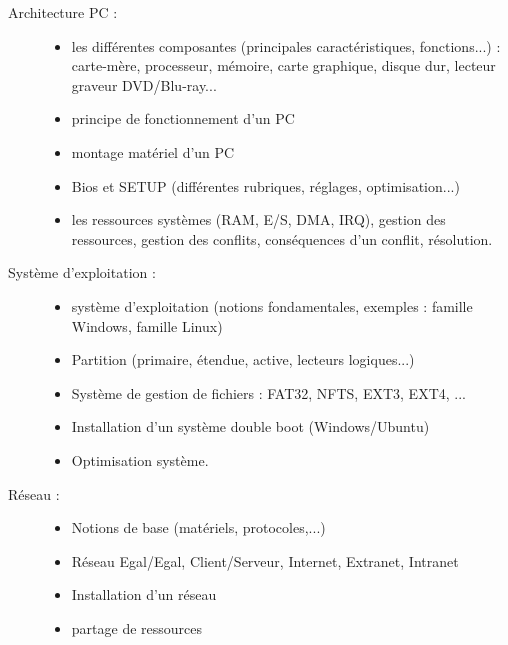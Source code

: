 \documentclass[10pt, a5paper]{report}
\begin{document}
\vfill


{
\begin{description}
\item[Architecture PC :]
\begin{itemize}
\item les différentes composantes (principales caractéristiques, fonctions...) : carte-mère, processeur, mémoire, carte graphique, disque dur, lecteur graveur DVD/Blu-ray...
\item principe de fonctionnement d'un PC
\item montage matériel d'un PC
\item Bios et SETUP (différentes rubriques, réglages, optimisation...)
\item les ressources systèmes (RAM, E/S, DMA, IRQ), gestion des ressources, gestion des conflits, conséquences d'un conflit, résolution.
\end{itemize}
\item[Système d'exploitation :]
\begin{itemize}
\item système d'exploitation (notions fondamentales, exemples : famille Windows, famille Linux)
\item Partition (primaire, étendue, active, lecteurs logiques...)
\item Système de gestion de fichiers : FAT32, NFTS, EXT3, EXT4, ...
\item Installation d'un système double boot (Windows/Ubuntu)
\item Optimisation système.
\end{itemize}
\item[Réseau :]
\begin{itemize}
\item Notions de base (matériels, protocoles,...)
\item Réseau Egal/Egal, Client/Serveur, Internet, Extranet, Intranet
\item Installation d'un réseau
\item partage de ressources
\end{itemize}
\end{description}
}
\end{document}
